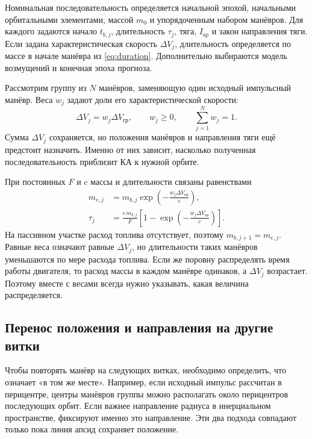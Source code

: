 \documentclass[a4paper,11pt]{article}
\numberwithin{equation}{section}
\begin{document}
Номинальная последовательность определяется начальной эпохой,
начальными орбитальными элементами, массой $m_0$ и упорядоченным набором
манёвров. Для каждого задаются начало $t_{b,j}$, длительность
$\tau_j$, тяга, $I_{\mathrm{sp}}$ и закон направления тяги.
Если задана характеристическая скорость $\Delta V_j$, длительность
определяется по массе в начале манёвра из \eqref{eq:duration}.
Дополнительно выбираются модель возмущений и конечная эпоха прогноза.

Рассмотрим группу из $N$ манёвров, заменяющую один исходный
импульсный манёвр. Веса $w_j$ задают доли его характеристической скорости:
\begin{equation}
\Delta V_j=w_j\Delta V_{\text{гр}},\qquad
w_j\geqslant0,\qquad \sum_{j=1}^{N}w_j=1.
\label{eq:weights}
\end{equation}
Сумма $\Delta V_j$ сохраняется, но положения манёвров и направления
тяги ещё предстоит назначить. Именно от них зависит, насколько
полученная последовательность приблизит КА к нужной орбите.

При постоянных $F$ и $c$ массы и длительности связаны равенствами
\begin{equation}
\begin{aligned}
m_{e,j}&=m_{b,j}\exp\!\left(-\frac{w_j\Delta V_{\text{гр}}}{c}\right),\\
\tau_j&=\frac{c\,m_{b,j}}{F}
 \left[1-\exp\!\left(-\frac{w_j\Delta V_{\text{гр}}}{c}\right)\right].
\end{aligned}
\label{eq:weighted-time}
\end{equation}
На пассивном участке расход топлива отсутствует, поэтому
$m_{b,j+1}=m_{e,j}$. Равные веса означают равные $\Delta V_j$,
но длительности таких манёвров уменьшаются по мере расхода топлива.
Если же поровну распределять время работы двигателя, то расход массы
в каждом манёвре одинаков, а $\Delta V_j$ возрастает.
Поэтому вместе с весами всегда нужно указывать, какая величина распределяется.

\subsection{Перенос положения и направления на другие витки}

Чтобы повторять манёвр на следующих витках, необходимо определить,
что означает «в том же месте». Например, если исходный импульс
рассчитан в перицентре, центры манёвров группы можно располагать
около перицентров последующих орбит. Если важнее направление
радиуса в инерциальном пространстве, фиксируют именно это направление.
Эти два подхода совпадают только пока линия апсид сохраняет положение.
\end{document}
